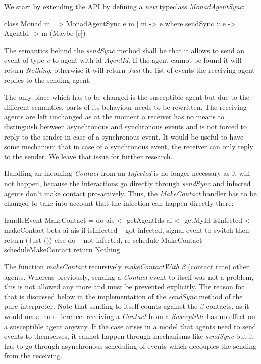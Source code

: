 We start by extending the API by defining a \textit{new} typeclass \textit{MonadAgentSync}:

\begin{HaskellCode}
class Monad m => MonadAgentSync e m | m -> e where
  sendSync :: e -> AgentId -> m (Maybe [e])
\end{HaskellCode}

The semantics behind the \textit{sendSync} method shall be that it allows to send an event of type \textit{e} to agent with id \textit{AgentId}. If the agent cannot be found it will return \textit{Nothing}, otherwise it will return \textit{Just} the list of events the receiving agent replies to the sending agent. 

The only place which has to be changed is the susceptible agent but due to the different semantics, parts of its behaviour needs to be rewritten. The receiving agents are left unchanged as at the moment a receiver has no means to distinguish between asynchronous and synchronous events and is not forced to reply to the sender in case of a synchronous event. It would be useful to have some mechanism that in case of a synchronous event, the receiver can only reply to the sender. We leave that issue for further research.

Handling an incoming \textit{Contact} from an \textit{Infected} is no longer necessary as it will not happen, because the interactions go directly through \textit{sendSync} and infected agents don't make contact pro-actively. Thus, the \textit{MakeContact} handler has to be changed to take into account that the infection can happen directly there:

\begin{HaskellCode}
handleEvent MakeContact = do
  ais        <- getAgentIds
  ai         <- getMyId
  isInfected <- makeContact beta ai ais
  if isInfected
    -- got infected, signal event to switch
    then return (Just ())
    else do
      -- not infected, re-schedule MakeContact
      scheduleMakeContact
      return Nothing
\end{HaskellCode}

The function \textit{makeContact} recursively \textit{makeContactWith} $\beta$ (contact rate) other agents. Whereas previously, sending a \textit{Contact} event to itself was not a problem, this is not allowed any more and must be prevented explicitly. The reason for that is discussed below in the implementation of the \textit{sendSync} method of the pure interpreter. Note that sending to itself counts against the $\beta$ contacts, as it would make no difference: receiving a \textit{Contact} from a \textit{Susceptible} has no effect on a susceptible agent anyway. If the case arises in a model that agents need to send events to themselves, it cannot happen through mechanisms like \textit{sendSync} but it has to go through asynchronous scheduling of events which decouples the sending from the receiving.

